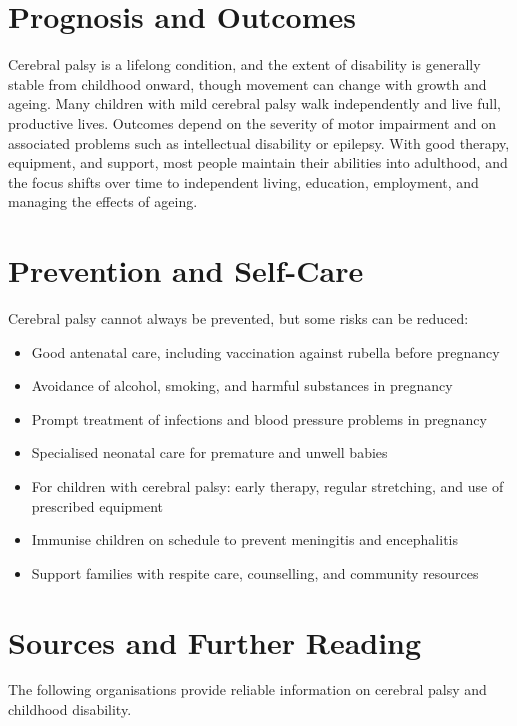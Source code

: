 \section*{Prognosis and Outcomes}
Cerebral palsy is a lifelong condition, and the extent of disability is generally stable from childhood onward, though movement can change with growth and ageing. Many children with mild cerebral palsy walk independently and live full, productive lives. Outcomes depend on the severity of motor impairment and on associated problems such as intellectual disability or epilepsy. With good therapy, equipment, and support, most people maintain their abilities into adulthood, and the focus shifts over time to independent living, education, employment, and managing the effects of ageing.

\section*{Prevention and Self-Care}
Cerebral palsy cannot always be prevented, but some risks can be reduced:

\begin{itemize}
    \item Good antenatal care, including vaccination against rubella before pregnancy
    \item Avoidance of alcohol, smoking, and harmful substances in pregnancy
    \item Prompt treatment of infections and blood pressure problems in pregnancy
    \item Specialised neonatal care for premature and unwell babies
    \item For children with cerebral palsy: early therapy, regular stretching, and use of prescribed equipment
    \item Immunise children on schedule to prevent meningitis and encephalitis
    \item Support families with respite care, counselling, and community resources
\end{itemize}

\section*{Sources and Further Reading}
The following organisations provide reliable information on cerebral palsy and childhood disability.

